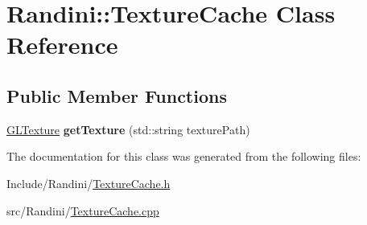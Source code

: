 \hypertarget{classRandini_1_1TextureCache}{
\section{Randini::TextureCache Class Reference}
\label{classRandini_1_1TextureCache}
}
\subsection*{Public Member Functions}
\begin{DoxyCompactItemize}
\item 
\hypertarget{classRandini_1_1TextureCache_a616aab3abb7b12c93ab9204432e9512d}{
\hyperlink{structRandini_1_1GLTexture}{GLTexture} {\bfseries getTexture} (std::string texturePath)}
\label{classRandini_1_1TextureCache_a616aab3abb7b12c93ab9204432e9512d}

\end{DoxyCompactItemize}


The documentation for this class was generated from the following files:\begin{DoxyCompactItemize}
\item 
Include/Randini/\hyperlink{TextureCache_8h}{TextureCache.h}\item 
src/Randini/\hyperlink{TextureCache_8cpp}{TextureCache.cpp}\end{DoxyCompactItemize}
